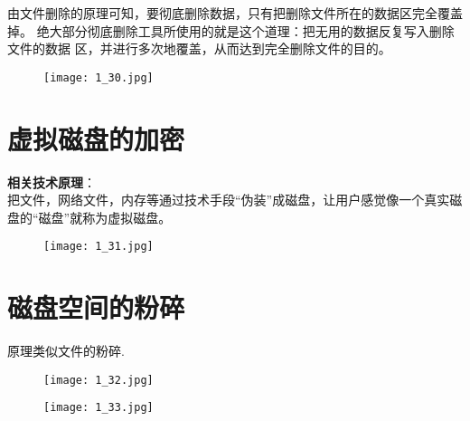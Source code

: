 \documentclass[../main.tex]{subfiles}
\begin{document}
由文件删除的原理可知，要彻底删除数据，只有把删除文件所在的数据区完全覆盖掉。
绝大部分彻底删除工具所使用的就是这个道理：把无用的数据反复写入删除文件的数据
区，并进行多次地覆盖，从而达到完全删除文件的目的。

\begin{figure}[H]
  \begin{center}
    \texttt{[image: 1\_30.jpg]}
  \end{center}
\end{figure}
%
\section{虚拟磁盘的加密}
\textbf{相关技术原理}： \\
把文件，网络文件，内存等通过技术手段``伪装''成磁盘，让用户感觉像一个真实磁
盘的``磁盘''就称为虚拟磁盘。

\begin{figure}[H]
  \begin{center}
    \texttt{[image: 1\_31.jpg]}
  \end{center}
\end{figure}
%
\section{磁盘空间的粉碎}
原理类似文件的粉碎.
\begin{figure}[H]
  \begin{center}
    \texttt{[image: 1\_32.jpg]}
  \end{center}
\end{figure}
\begin{figure}[H]
  \begin{center}
    \texttt{[image: 1\_33.jpg]}
  \end{center}
\end{figure}
%
\end{document}
